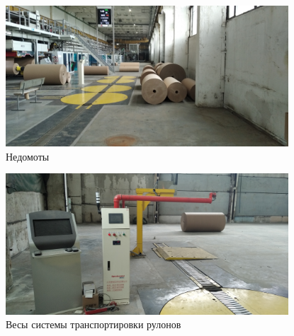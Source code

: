 \begin{figure}
\begin{center}
  \includegraphics[height=0.94\textheight, width=0.94\textwidth, keepaspectratio]{Pics 1/5 недомоты у ГА.jpg }
\end{center}
  \caption{Недомоты}
  \label{pic:5 недомоты у ГА}
\end{figure}

\begin{figure}
\begin{center}
  \includegraphics[height=0.94\textheight, width=0.94\textwidth, keepaspectratio]{Pics 1/5 Весы на ГА.jpg}
\end{center}
  \caption{Весы системы транспортировки рулонов}
  \label{pic:5 Весы на ГА}
\end{figure}

